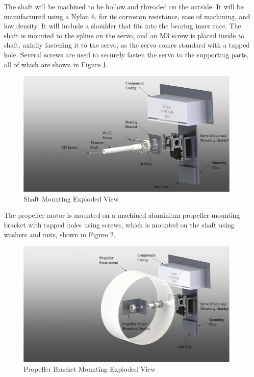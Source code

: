 \documentclass[../main.tex]{subfiles}
\begin{document}
 The shaft will be machined to be hollow and threaded on the outside. It will be manufactured using a Nylon 6, for its corrosion resistance, ease of machining, and low density. It will include a shoulder that fits into the bearing inner race. The shaft is mounted to the spline on the servo, and an M3 screw is placed inside to shaft, axially fastening it to the servo, as the servo comes standard with a tapped hole. Several screws are used to securely fasten the servo to the supporting parts, all of which are shown in Figure \ref{fig:shaftAssembly}.
 
  \begin{figure}[H]
 	\centering
 	\includegraphics[width=.8\linewidth]{img/design/thruster/shaftAssembly.png}
 	\caption{Shaft Mounting Exploded View}
 	\label{fig:shaftAssembly}
 \end{figure}
 
The propeller motor is mounted on a machined aluminium propeller mounting bracket with tapped holes using screws, which is mounted on the shaft using washers and nuts, shown in Figure \ref{fig:mountAssembly}.

 \begin{figure}[H]
	\centering
	\includegraphics[width=.8\linewidth]{img/design/thruster/mountAssembly.png}
	\caption{Propeller Bracket Mounting Exploded View}
	\label{fig:mountAssembly}
\end{figure}
\end{document}

